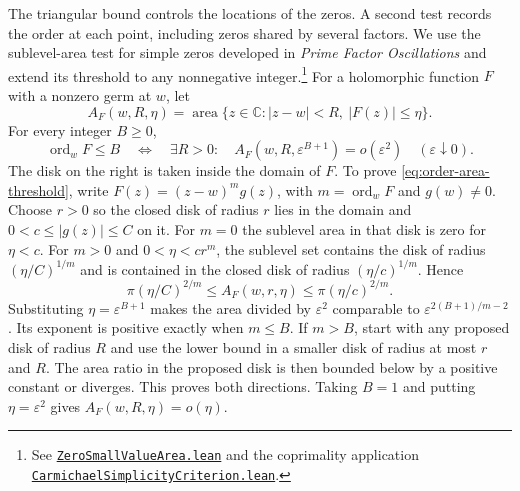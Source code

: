 \documentclass[11pt]{amsart}
\theoremstyle{definition}
\theoremstyle{remark}
\numberwithin{equation}{section}
\begin{document}
The triangular bound controls the locations of the zeros. A second test
records the order at each point, including zeros shared by several
factors. We use the sublevel-area test for simple zeros developed in
\emph{Prime Factor Oscillations} and extend its threshold to any
nonnegative integer.\footnote{See
\href{https://github.com/kimihiro64/prime-factor-oscillations/blob/5aa03e03423b7f9cee75f31798e9d68dde8c5dbf/PrimeFactorOscillations/Helpers/ZeroSmallValueArea.lean}{\texttt{ZeroSmallValueArea.lean}}
and the coprimality application
\href{https://github.com/kimihiro64/prime-factor-oscillations/blob/5aa03e03423b7f9cee75f31798e9d68dde8c5dbf/PrimeFactorOscillations/Assembly/CarmichaelSimplicityCriterion.lean}{\texttt{CarmichaelSimplicityCriterion.lean}}.}
For a holomorphic function \(F\) with a nonzero germ at \(w\), let
\[
 A_F(w,R,\eta)=
 \operatorname{area}\{z\in\mathbb C:|z-w|<R,\ |F(z)|\leq\eta\}.
\]
For every integer \(B\geq 0\),
\begin{equation}
 \operatorname{ord}_w F\leq B
 \quad\Longleftrightarrow\quad
 \exists R>0:\quad
 A_F(w,R,\varepsilon^{B+1})=o(\varepsilon^2)
 \quad(\varepsilon\downarrow0).
 \label{eq:order-area-threshold}
\end{equation}
The disk on the right is taken inside the domain of \(F\).
To prove \eqref{eq:order-area-threshold}, write
\(F(z)=(z-w)^m g(z)\), with \(m=\operatorname{ord}_w F\) and
\(g(w)\ne0\). Choose \(r>0\) so the closed disk of radius \(r\)
lies in the domain and \(0<c\leq|g(z)|\leq C\) on it.
For \(m=0\) the sublevel area in that disk is zero for \(\eta<c\).
For \(m>0\) and \(0<\eta<cr^m\), the sublevel set contains
the disk of radius \((\eta/C)^{1/m}\) and is contained in the
closed disk of radius \((\eta/c)^{1/m}\). Hence
\[
 \pi(\eta/C)^{2/m}\leq A_F(w,r,\eta)\leq\pi(\eta/c)^{2/m}.
\]
Substituting \(\eta=\varepsilon^{B+1}\) makes the area divided by
\(\varepsilon^2\) comparable to
\(\varepsilon^{2(B+1)/m-2}\). Its exponent is positive exactly
when \(m\leq B\). If \(m>B\), start with any proposed disk of
radius \(R\) and use the lower bound in a smaller disk of radius
at most \(r\) and \(R\). The area ratio in the proposed disk is
then bounded below by a positive constant or diverges. This
proves both directions. Taking \(B=1\) and putting
\(\eta=\varepsilon^2\) gives \(A_F(w,R,\eta)=o(\eta)\).
\end{document}
